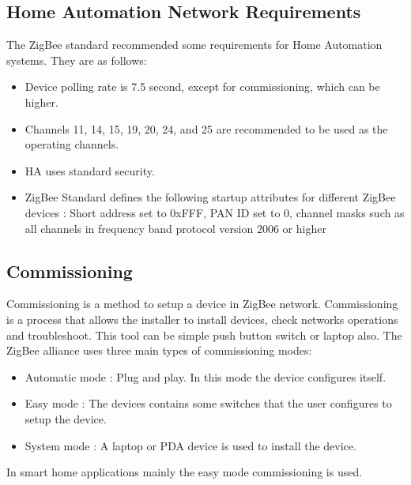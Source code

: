 \documentclass[conference]{IEEEtran}
\begin{document}
\subsection{Home Automation Network Requirements}
The ZigBee standard recommended some requirements for Home Automation systems. They are as follows:
\begin{itemize}
    \item Device polling rate is 7.5 second, except for commissioning, which 
        can be higher.
\end{itemize}
\begin{itemize}
    \item Channels 11, 14, 15, 19, 20, 24, and 25 are recommended to be used 
        as the operating channels.
\end{itemize}
\begin{itemize}
    \item  HA uses standard security.

\end{itemize}
\begin{itemize}
    \item ZigBee Standard defines the following startup attributes for 
        different ZigBee devices : Short address set to 0xFFF, PAN ID set to 0, 
        channel masks such as all channels in frequency band protocol 
        version 2006 or higher

\end{itemize}

\subsection{Commissioning}
Commissioning is a method to setup a device in ZigBee network. Commissioning is a process that allows the installer to install devices, check networks operations and troubleshoot. This tool can be simple push button switch or laptop also.  The ZigBee alliance uses three main types of commissioning modes: 
\begin{itemize}
    \item Automatic mode : Plug and play. In this mode the device configures 
        itself.
    \item Easy mode : The devices contains some switches that the user 
        configures to setup the device.
        \item System mode : A laptop or PDA device is used to install the device.
\end{itemize}

In smart home applications mainly the easy mode commissioning is used.
\end{document}
